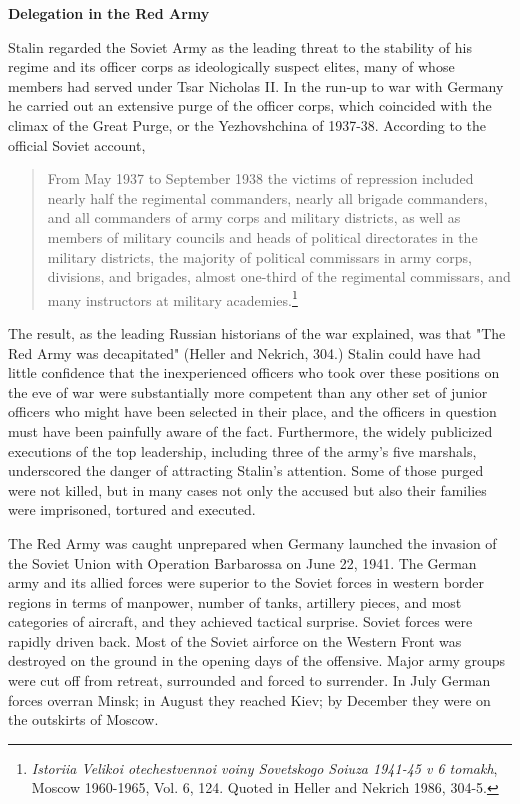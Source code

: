 \documentclass[11pt,]{article}
\begin{document}
\begin{center}
\textbf{\Large{Delegation in the Red Army}}\normalsize\\
\end{center}
Stalin regarded the Soviet Army as the leading threat to the stability of his regime and its officer corps as ideologically suspect elites, many of whose members had served under Tsar Nicholas II.  In the run-up to war with Germany he carried out an extensive purge of the officer corps, which coincided with the climax of the Great Purge, or the Yezhovshchina of 1937-38.  According to the official Soviet account, 

\begin{quotation}\noindent
From May 1937 to September 1938 the victims of repression included nearly half the regimental commanders, nearly all brigade commanders, and all commanders of army corps and military districts, as well as members of military councils and heads of political directorates in the military districts, the majority of political commissars in army corps, divisions, and brigades, almost one-third of the regimental commissars, and many instructors at military academies.\footnote{\textit{Istoriia Velikoi otechestvennoi voiny Sovetskogo Soiuza 1941-45 v 6 tomakh}, Moscow 1960-1965, Vol. 6, 124. Quoted in Heller and Nekrich 1986, 304-5.}
\end{quotation}

The result, as the leading Russian historians of the war explained, was that "The Red Army was decapitated" (Heller and Nekrich, 304.)  Stalin could have had little confidence that the inexperienced officers who took over these positions on the eve of war were substantially more competent than any other set of junior officers who might have been selected in their place, and the officers in question must have been painfully aware of the fact.  Furthermore, the widely publicized executions of the top leadership, including three of the army's five marshals, underscored the danger of attracting Stalin's attention.  Some of those purged were not killed, but in many cases not only the accused but also their families were imprisoned, tortured and executed.

The Red Army was caught unprepared when Germany launched the invasion of the Soviet Union with Operation Barbarossa  on June 22, 1941.  The German army and its allied forces were superior to the Soviet forces in western border regions in terms of manpower, number of tanks, artillery pieces, and most categories of aircraft, and they achieved tactical surprise.  Soviet forces were rapidly driven back.  Most of the Soviet airforce on the Western Front was destroyed on the ground in the opening days of the offensive.  Major army groups were cut off from retreat, surrounded and forced to surrender.  In July German forces overran Minsk; in August they reached Kiev; by December they were on the outskirts of Moscow.  
\end{document}
